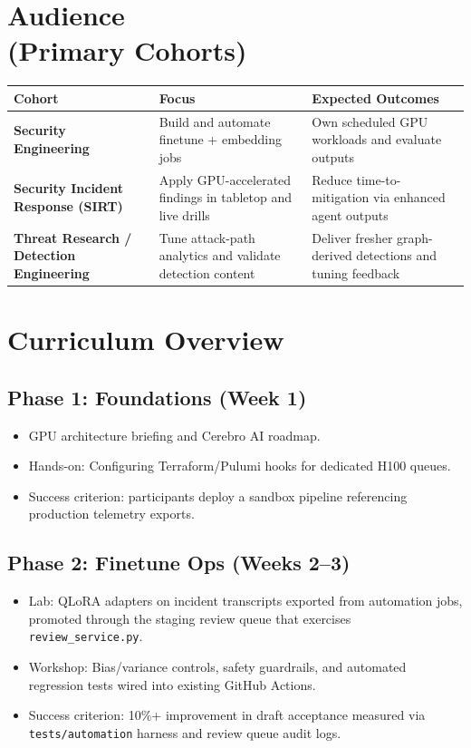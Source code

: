 \documentclass[11pt]{scrartcl}
\begin{document}
\section{Audience \\ \normalsize (Primary Cohorts)}
\begin{tabularx}{\textwidth}{>{\bfseries}l X X}
  \textcolor{Primary}{Cohort} & Focus & Expected Outcomes \\\hline
  Security Engineering & Build and automate finetune + embedding jobs & Own scheduled GPU workloads and evaluate outputs \\
  Security Incident Response (SIRT) & Apply GPU-accelerated findings in tabletop and live drills & Reduce time-to-mitigation via enhanced agent outputs \\
  Threat Research / Detection Engineering & Tune attack-path analytics and validate detection content & Deliver fresher graph-derived detections and tuning feedback \\
\end{tabularx}

\section{Curriculum Overview}
\subsection*{Phase 1: Foundations (Week 1)}
\begin{itemize}
  \item GPU architecture briefing and Cerebro AI roadmap.
  \item Hands-on: Configuring Terraform/Pulumi hooks for dedicated H100 queues.
  \item Success criterion: participants deploy a sandbox pipeline referencing production telemetry exports.
\end{itemize}

\subsection*{Phase 2: Finetune Ops (Weeks 2--3)}
\begin{itemize}
  \item Lab: QLoRA adapters on incident transcripts exported from automation jobs, promoted through the staging review queue that exercises \texttt{review\_service.py}.
  \item Workshop: Bias/variance controls, safety guardrails, and automated regression tests wired into existing GitHub Actions.
  \item Success criterion: 10\%+ improvement in draft acceptance measured via \texttt{tests/automation} harness and review queue audit logs.
\end{itemize}
\end{document}
